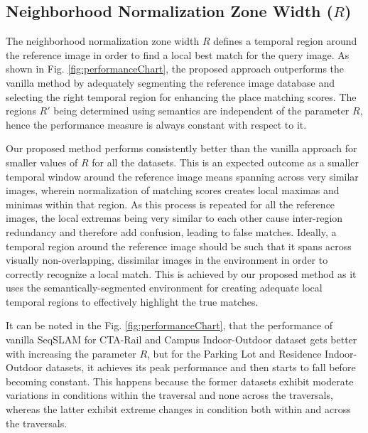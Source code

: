 \documentclass[letterpaper, 10 pt, conference]{ieeeconf}  %
\begin{document}
\subsection{Neighborhood Normalization Zone Width ($R$)}
The neighborhood normalization zone width $R$ defines a temporal region around the reference image in order to find a local best match for the query image. As shown in Fig. \ref{fig:performanceChart}, the proposed approach outperforms the vanilla method \cite{Milford2012} by adequately segmenting the reference image database and selecting the right temporal region for enhancing the place matching scores. The regions $R'$ being determined using semantics are independent of the parameter $R$, hence the performance measure is always constant with respect to it.

Our proposed method performs consistently better than the vanilla approach for smaller values of $R$ for all the datasets. This is an expected outcome as a smaller temporal window around the reference image means spanning across very similar images, wherein normalization of matching scores creates local maximas and minimas within that region. As this process is repeated for all the reference images, the local extremas being very similar to each other cause inter-region redundancy and therefore add confusion, leading to false matches. Ideally, a temporal region around the reference image should be such that it spans across visually non-overlapping, dissimilar images in the environment in order to correctly recognize a local match. This is achieved by our proposed method as it uses the semantically-segmented environment for creating adequate local temporal regions to effectively highlight the true matches.

It can be noted in the Fig. \ref{fig:performanceChart}, that the performance of vanilla SeqSLAM for CTA-Rail and Campus Indoor-Outdoor dataset gets better with increasing the parameter $R$, but for the Parking Lot and Residence Indoor-Outdoor datasets, it achieves its peak performance and then starts to fall before becoming constant. This happens because the former datasets exhibit moderate variations in conditions within the traversal and none across the traversals, whereas the latter exhibit extreme changes in condition both within and across the traversals. 
\end{document}
